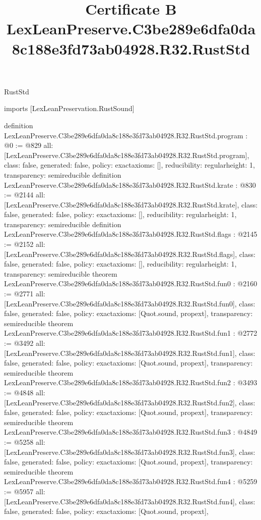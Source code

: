 \begin{lexlean}{RustStd}
\title{Certificate B LexLeanPreserve.C3be289e6dfa0da8c188e3fd73ab04928.R32.RustStd}
\begin{coremodule}
imports [LexLeanPreservation.RustSound]

definition LexLeanPreserve.C3be289e6dfa0da8c188e3fd73ab04928.R32.RustStd.program : @0 := @829 {
  all: [LexLeanPreserve.C3be289e6dfa0da8c188e3fd73ab04928.R32.RustStd.program],
  class: false,
  generated: false,
  policy: exact{axioms: []},
  reducibility: regular{height: 1},
  transparency: semireducible
}
definition LexLeanPreserve.C3be289e6dfa0da8c188e3fd73ab04928.R32.RustStd.krate : @830 := @2144 {
  all: [LexLeanPreserve.C3be289e6dfa0da8c188e3fd73ab04928.R32.RustStd.krate],
  class: false,
  generated: false,
  policy: exact{axioms: []},
  reducibility: regular{height: 1},
  transparency: semireducible
}
definition LexLeanPreserve.C3be289e6dfa0da8c188e3fd73ab04928.R32.RustStd.flags : @2145 := @2152 {
  all: [LexLeanPreserve.C3be289e6dfa0da8c188e3fd73ab04928.R32.RustStd.flags],
  class: false,
  generated: false,
  policy: exact{axioms: []},
  reducibility: regular{height: 1},
  transparency: semireducible
}
theorem LexLeanPreserve.C3be289e6dfa0da8c188e3fd73ab04928.R32.RustStd.fun0 : @2160 := @2771 {
  all: [LexLeanPreserve.C3be289e6dfa0da8c188e3fd73ab04928.R32.RustStd.fun0],
  class: false,
  generated: false,
  policy: exact{axioms: [Quot.sound, propext]},
  transparency: semireducible
}
theorem LexLeanPreserve.C3be289e6dfa0da8c188e3fd73ab04928.R32.RustStd.fun1 : @2772 := @3492 {
  all: [LexLeanPreserve.C3be289e6dfa0da8c188e3fd73ab04928.R32.RustStd.fun1],
  class: false,
  generated: false,
  policy: exact{axioms: [Quot.sound, propext]},
  transparency: semireducible
}
theorem LexLeanPreserve.C3be289e6dfa0da8c188e3fd73ab04928.R32.RustStd.fun2 : @3493 := @4848 {
  all: [LexLeanPreserve.C3be289e6dfa0da8c188e3fd73ab04928.R32.RustStd.fun2],
  class: false,
  generated: false,
  policy: exact{axioms: [Quot.sound, propext]},
  transparency: semireducible
}
theorem LexLeanPreserve.C3be289e6dfa0da8c188e3fd73ab04928.R32.RustStd.fun3 : @4849 := @5258 {
  all: [LexLeanPreserve.C3be289e6dfa0da8c188e3fd73ab04928.R32.RustStd.fun3],
  class: false,
  generated: false,
  policy: exact{axioms: [Quot.sound, propext]},
  transparency: semireducible
}
theorem LexLeanPreserve.C3be289e6dfa0da8c188e3fd73ab04928.R32.RustStd.fun4 : @5259 := @5957 {
  all: [LexLeanPreserve.C3be289e6dfa0da8c188e3fd73ab04928.R32.RustStd.fun4],
  class: false,
  generated: false,
  policy: exact{axioms: [Quot.sound, propext]},
}
\end{coremodule}
\end{lexlean}
